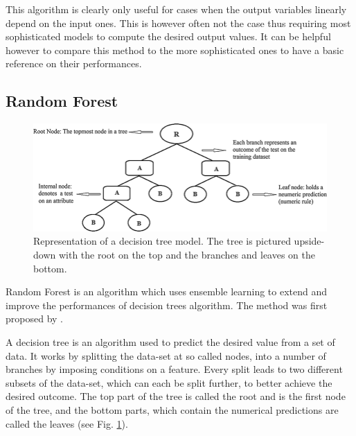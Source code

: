 This algorithm is clearly only useful for cases when the output variables linearly depend on the input ones. This is however often not the case thus requiring most sophisticated models to compute the desired output values. It can be helpful however to compare this method to the more sophisticated ones to have a basic reference on their performances.

\subsection{Random Forest}\label{random-forest}
\begin{figure}[!tp]
	\centering		  
	\includegraphics[width=1.\textwidth]{figures/decision_tree.png}
	\caption{Representation of a decision tree model. The tree is pictured upside-down with the root on the top and the branches and leaves on the bottom.}
	\label{fig:tree}
\end{figure}
Random Forest is an algorithm which uses ensemble learning to extend and improve the performances of decision trees algorithm. The method was first proposed by \citet{RandomHo1995}. 

A decision tree is an algorithm used to predict the desired value from a set of data. It works by splitting the data-set at so called nodes, into a number of branches by imposing conditions on a feature. Every split leads to two different subsets of the data-set, which can each be split further, to better achieve the desired outcome. The top part of the tree is called the root and is the first node of the tree, and the bottom parts, which contain the numerical predictions are called the leaves (see Fig. \ref{fig:tree}).

